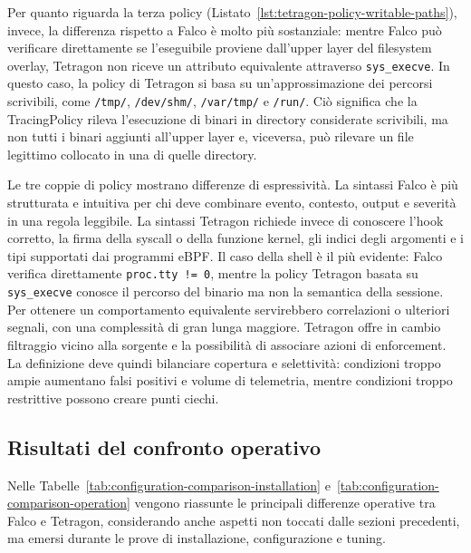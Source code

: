 \documentclass[12pt,a4paper,openright,twoside]{book}
\begin{document}
Per quanto riguarda la terza policy (Listato~\ref{lst:tetragon-policy-writable-paths}), invece, la differenza rispetto a Falco è molto più sostanziale: mentre Falco può verificare direttamente se l'eseguibile proviene dall'upper layer del filesystem overlay, Tetragon non riceve un attributo equivalente attraverso \texttt{sys\_execve}. In questo caso, la policy di Tetragon si basa su un'approssimazione dei percorsi scrivibili, come \texttt{/tmp/}, \texttt{/dev/shm/}, \texttt{/var/tmp/} e \texttt{/run/}. Ciò significa che la TracingPolicy rileva l'esecuzione di binari in directory considerate scrivibili, ma non tutti i binari aggiunti all'upper layer e, viceversa, può rilevare un file legittimo collocato in una di quelle directory.

Le tre coppie di policy mostrano differenze di espressività. La sintassi Falco è più strutturata e intuitiva per chi deve combinare evento, contesto, output e severità in una regola leggibile. La sintassi Tetragon richiede invece di conoscere l'hook corretto, la firma della syscall o della funzione kernel, gli indici degli argomenti e i tipi supportati dai programmi eBPF. Il caso della shell è il più evidente: Falco verifica direttamente \texttt{proc.tty != 0}, mentre la policy Tetragon basata su \texttt{sys\_execve} conosce il percorso del binario ma non la semantica della sessione. Per ottenere un comportamento equivalente servirebbero correlazioni o ulteriori segnali, con una complessità di gran lunga maggiore. Tetragon offre in cambio filtraggio vicino alla sorgente e la possibilità di associare azioni di enforcement. La definizione deve quindi bilanciare copertura e selettività: condizioni troppo ampie aumentano falsi positivi e volume di telemetria, mentre condizioni troppo restrittive possono creare punti ciechi.

\subsection{Risultati del confronto operativo}
Nelle Tabelle~\ref{tab:configuration-comparison-installation} e~\ref{tab:configuration-comparison-operation} vengono riassunte le principali differenze operative tra Falco e Tetragon, considerando anche aspetti non toccati dalle sezioni precedenti, ma emersi durante le prove di installazione, configurazione e tuning.
\end{document}
